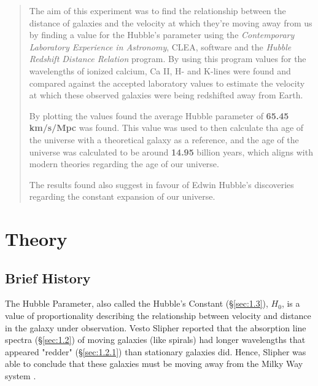 \documentclass[12pt]{article}
\begin{document}
\begin{abstract}

\vspace{1cm}

The aim of this experiment was to find the relationship between the distance of galaxies and the velocity at which they're moving away from us by
finding a value for the Hubble's parameter using the \textit{Contemporary Laboratory Experience in Astronomy}, CLEA, software and the \textit{Hubble Redshift Distance Relation} program.
By using this program values for the wavelengths of ionized calcium, Ca II, H- and K-lines were found and compared against the accepted laboratory
values to estimate the velocity at which these observed galaxies were being redshifted away from Earth.

By plotting the values found the average Hubble parameter of \textbf{65.45 km/s/Mpc} was found. This value was used to then calculate tha age of the universe with a theoretical
galaxy as a reference, and the age of the universe was calculated to be around \textbf{14.95} billion years, which aligns with modern theories regarding
the age of our universe.

The results found also suggest in favour of Edwin Hubble's discoveries regarding the constant expansion of our universe.

\end{abstract}


\vspace{3cm}

\section{Theory} \label{sec:1}

\subsection{Brief History} \label{sec:1.1}

The Hubble Parameter, also called the Hubble's Constant (§\ref{sec:1.3}), $H_0$, is a value of \break
proportionality describing the relationship
between velocity and distance in the galaxy under observation. Vesto Slipher reported that the absorption line spectra (§\ref{sec:1.2}) of moving galaxies
(like spirals) had longer wavelengths that appeared "redder" (§\ref{sec:1.2.1}) than stationary galaxies did. Hence, Slipher was able to conclude 
that these galaxies must be moving away from the Milky Way system
\cite{UCDhubble,brithubble}.
\end{document}
